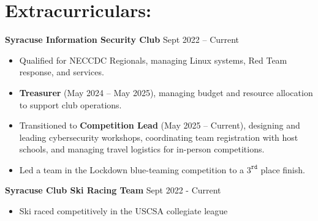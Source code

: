 \documentclass[11pt]{article}       %
\begin{document}
	\section*{Extracurriculars:}
\textbf{Syracuse Information Security Club} \hfill Sept 2022 – Current \\
\vspace{-9pt}
\begin{itemize}
	\item Qualified for NECCDC Regionals, managing Linux systems, Red Team response, and services.  
	\item \textbf{Treasurer} (May 2024 – May 2025), managing budget and resource allocation to support club operations.  
	\item Transitioned to \textbf{Competition Lead} (May 2025 – Current), designing and leading cybersecurity workshops, coordinating team registration with host schools, and managing travel logistics for in-person competitions.  
	\item Led a team in the Lockdown blue-teaming competition to a $3^{\texttt{rd}}$ place finish.  
\end{itemize}
	
	\vspace{-7pt}
	
	\textbf{Syracuse Club Ski Racing Team} \hfill Sept 2022 - Current\\
	\vspace{-9pt}
	\begin{itemize}
		\item Ski raced competitively in the USCSA collegiate league
	\end{itemize}
\vspace{-25pt}
%

	
	
	\vspace{-18.5pt}
	
	
	
\end{document}
